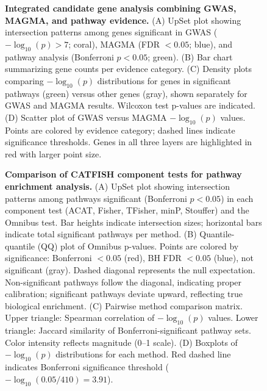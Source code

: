 \documentclass[11pt]{article}
\begin{document}
\begin{figure}[htbp]
\centering
\caption{\textbf{Integrated candidate gene analysis combining GWAS, MAGMA, and pathway evidence.}
(A) UpSet plot showing intersection patterns among genes significant in GWAS ($-\log_{10}(p) > 7$; coral), MAGMA (FDR $< 0.05$; blue), and pathway analysis (Bonferroni $p < 0.05$; green).
(B) Bar chart summarizing gene counts per evidence category.
(C) Density plots comparing $-\log_{10}(p)$ distributions for genes in significant pathways (green) versus other genes (gray), shown separately for GWAS and MAGMA results. Wilcoxon test p-values are indicated.
(D) Scatter plot of GWAS versus MAGMA $-\log_{10}(p)$ values. Points are colored by evidence category; dashed lines indicate significance thresholds. Genes in all three layers are highlighted in red with larger point size.}
\label{fig:figure5}
\end{figure}

\begin{figure}[htbp]
\centering
\caption{\textbf{Comparison of CATFISH component tests for pathway enrichment analysis.}
(A) UpSet plot showing intersection patterns among pathways significant (Bonferroni $p < 0.05$) in each component test (ACAT, Fisher, TFisher, minP, Stouffer) and the Omnibus test. Bar heights indicate intersection sizes; horizontal bars indicate total significant pathways per method.
(B) Quantile-quantile (QQ) plot of Omnibus p-values. Points are colored by significance: Bonferroni $< 0.05$ (red), BH FDR $< 0.05$ (blue), not significant (gray). Dashed diagonal represents the null expectation. Non-significant pathways follow the diagonal, indicating proper calibration; significant pathways deviate upward, reflecting true biological enrichment.
(C) Pairwise method comparison matrix. Upper triangle: Spearman correlation of $-\log_{10}(p)$ values. Lower triangle: Jaccard similarity of Bonferroni-significant pathway sets. Color intensity reflects magnitude (0--1 scale).
(D) Boxplots of $-\log_{10}(p)$ distributions for each method. Red dashed line indicates Bonferroni significance threshold ($-\log_{10}(0.05/410) = 3.91$).}
\label{fig:suppfig}
\end{figure}
\end{document}
